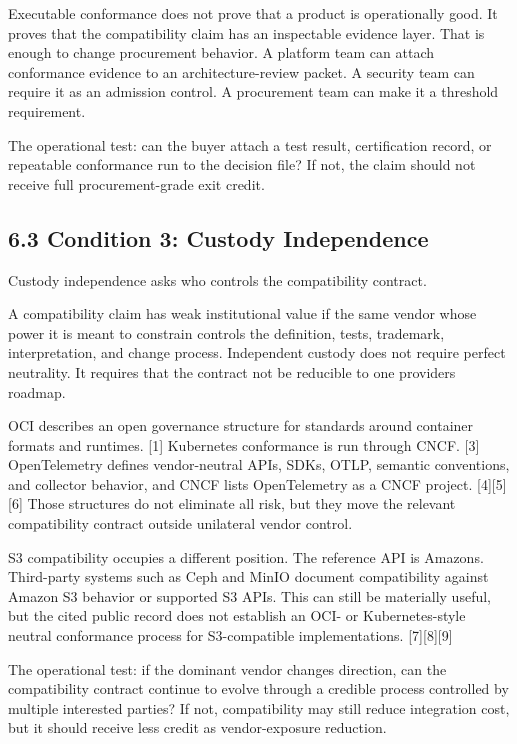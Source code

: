 \documentclass[11pt]{article}
\begin{document}
Executable conformance does not prove that a product is operationally good. It proves that the compatibility claim has an inspectable evidence layer. That is enough to change procurement behavior. A platform team can attach conformance evidence to an architecture-review packet. A security team can require it as an admission control. A procurement team can make it a threshold requirement.

The operational test: can the buyer attach a test result, certification record, or repeatable conformance run to the decision file? If not, the claim should not receive full procurement-grade exit credit.

\subsection{6.3 Condition 3: Custody Independence}\label{condition-3-custody-independence}

Custody independence asks who controls the compatibility contract.

A compatibility claim has weak institutional value if the same vendor whose power it is meant to constrain controls the definition, tests, trademark, interpretation, and change process. Independent custody does not require perfect neutrality. It requires that the contract not be reducible to one provider\textquotesingle s roadmap.

OCI describes an open governance structure for standards around container formats and runtimes. {[}1{]} Kubernetes conformance is run through CNCF. {[}3{]} OpenTelemetry defines vendor-neutral APIs, SDKs, OTLP, semantic conventions, and collector behavior, and CNCF lists OpenTelemetry as a CNCF project. {[}4{]}{[}5{]}{[}6{]} Those structures do not eliminate all risk, but they move the relevant compatibility contract outside unilateral vendor control.

S3 compatibility occupies a different position. The reference API is Amazon\textquotesingle s. Third-party systems such as Ceph and MinIO document compatibility against Amazon S3 behavior or supported S3 APIs. This can still be materially useful, but the cited public record does not establish an OCI- or Kubernetes-style neutral conformance process for S3-compatible implementations. {[}7{]}{[}8{]}{[}9{]}

The operational test: if the dominant vendor changes direction, can the compatibility contract continue to evolve through a credible process controlled by multiple interested parties? If not, compatibility may still reduce integration cost, but it should receive less credit as vendor-exposure reduction.
\end{document}
